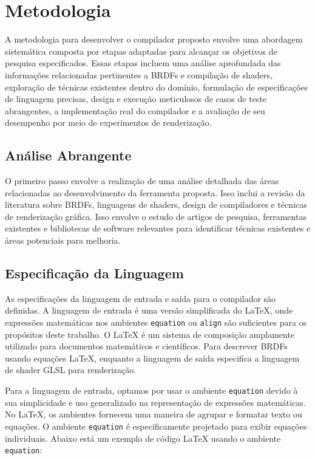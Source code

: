 \documentclass[english, 
               brazil, 
               bsc] %
               {dcomp-abntex2}
\begin{document}
\chapter{Metodologia}

A metodologia para desenvolver o compilador proposto envolve uma abordagem sistemática composta por etapas adaptadas para alcançar os objetivos de pesquisa especificados. Essas etapas incluem uma análise aprofundada das informações relacionadas pertinentes a BRDFs e compilação de shaders, exploração de técnicas existentes dentro do domínio, formulação de especificações de linguagem precisas, design e execução meticulosos de casos de teste abrangentes, a implementação real do compilador e a avaliação de seu desempenho por meio de experimentos de renderização.


\section{Análise Abrangente}

O primeiro passo envolve a realização de uma análise detalhada das áreas relacionadas ao desenvolvimento da ferramenta proposta. Isso inclui a revisão da literatura sobre BRDFs, linguagens de shaders, design de compiladores e técnicas de renderização gráfica. Isso envolve o estudo de artigos de pesquisa, ferramentas existentes e bibliotecas de software relevantes para identificar técnicas existentes e áreas potenciais para melhoria.



\section{Especificação da Linguagem}

As especificações da linguagem de entrada e saída para o compilador são definidas. A linguagem de entrada é uma versão simplificada do LaTeX, onde expressões matemáticas nos ambientes \texttt{equation} ou \texttt{align} são suficientes para os propósitos deste trabalho. O LaTeX é um sistema de composição amplamente utilizado para documentos matemáticos e científicos. Para descrever BRDFs usando equações LaTeX, enquanto a linguagem de saída especifica a linguagem de shader GLSL para renderização.

Para a linguagem de entrada, optamos por usar o ambiente \texttt{equation} devido à sua simplicidade e uso generalizado na representação de expressões matemáticas. No LaTeX, os ambientes fornecem uma maneira de agrupar e formatar texto ou equações. O ambiente \texttt{equation} é especificamente projetado para exibir equações individuais. Abaixo está um exemplo de código LaTeX usando o ambiente \texttt{equation}:
\end{document}
